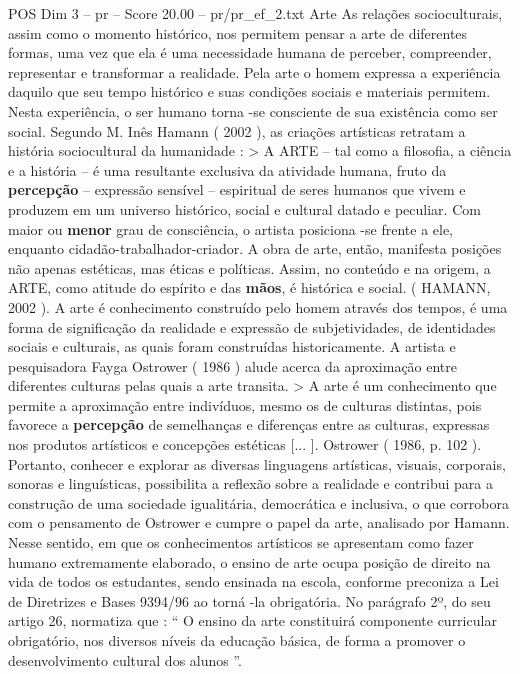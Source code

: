 \begin{textsample}{POS Dim 3 – pr – Score 20.00 – pr/pr\_ef\_2.txt}  \label{ex:f3_pos_153}
Arte As relações socioculturais, assim como o momento histórico, nos permitem pensar a arte de diferentes formas, uma vez que ela é uma necessidade humana de perceber, compreender, representar e transformar a realidade.
Pela arte o homem expressa a experiência daquilo que seu tempo histórico e suas condições sociais e materiais permitem.
Nesta experiência, o ser humano torna -se consciente de sua existência como ser social.
Segundo M.
Inês Hamann ( 2002 ), as criações artísticas retratam a história sociocultural da humanidade : > A ARTE – tal como a filosofia, a ciência e a história – é uma resultante exclusiva da atividade humana, fruto da \textbf{percepção} – expressão sensível – espiritual de seres humanos que vivem e produzem em um universo histórico, social e cultural datado e peculiar.
Com maior ou \textbf{menor} grau de consciência, o artista posiciona -se frente a ele, enquanto cidadão-trabalhador-criador.
A obra de arte, então, manifesta posições não apenas estéticas, mas éticas e políticas.
Assim, no conteúdo e na origem, a ARTE, como atitude do espírito e das \textbf{mãos}, é histórica e social. ( HAMANN, 2002 ).
A arte é conhecimento construído pelo homem através dos tempos, é uma forma de significação da realidade e expressão de subjetividades, de identidades sociais e culturais, as quais foram construídas historicamente.
A artista e pesquisadora Fayga Ostrower ( 1986 ) alude acerca da aproximação entre diferentes culturas pelas quais a arte transita. > A arte é um conhecimento que permite a aproximação entre indivíduos, mesmo os de culturas distintas, pois favorece a \textbf{percepção} de semelhanças e diferenças entre as culturas, expressas nos produtos artísticos e concepções estéticas [... ].
Ostrower ( 1986, p. 102 ).
Portanto, conhecer e explorar as diversas linguagens artísticas, visuais, corporais, sonoras e linguísticas, possibilita a reflexão sobre a realidade e contribui para a construção de uma sociedade igualitária, democrática e inclusiva, o que corrobora com o pensamento de Ostrower e cumpre o papel da arte, analisado por Hamann.
Nesse sentido, em que os conhecimentos artísticos se apresentam como fazer humano extremamente elaborado, o ensino de arte ocupa posição de direito na vida de todos os estudantes, sendo ensinada na escola, conforme preconiza a Lei de Diretrizes e Bases 9394/96 ao torná -la obrigatória.
No parágrafo 2º, do seu artigo 26, normatiza que : “ O ensino da arte constituirá componente curricular obrigatório, nos diversos níveis da educação básica, de forma a promover o desenvolvimento cultural dos alunos ”.

\end{textsample}
